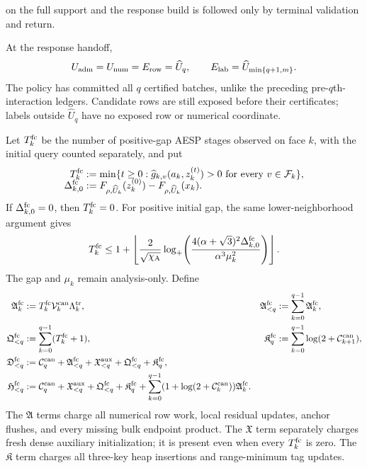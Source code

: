 \begin{definition}
\begin{enumerate}
       on the full support and the response build is followed only by
       terminal validation and return.
\end{enumerate}
At the response handoff,
\begin{equation}
 U_{\rm adm}=U_{\rm num}=E_{\rm row}=\widehat U_q,
 \qquad
 E_{\rm lab}=\widehat U_{\min\{q+1,m\}}.
 \label{eq:branch-caterpillar-incremental-face-arenas}
\end{equation}
The policy has committed all $q$ certified batches, unlike the preceding
pre-$q$th-interaction ledgers.  Candidate rows are still exposed before their
certificates; labels outside $\widehat U_q$ have no exposed row or numerical
coordinate.
\end{definition}

Let $T_k^{\rm fc}$ be the number of positive-gap AESP stages observed on face
$k$, with the initial query counted separately, and put
\begin{align}
 T_k^{\rm fc}
 &:=
 \min\{t\geq0:\widehat g_{k,v}(a_k,z_k^{(t)})>0
       \text{ for every }v\in\mathcal F_k\},
 \notag\\[-1.5ex]
 \Delta_{k,0}^{\rm fc}
 &:=F_{\rho,\widehat U_k}(z_k^{(0)})
       -F_{\rho,\widehat U_k}(x_k).
 \label{eq:branch-caterpillar-incremental-face-stopping-time}
\end{align}
If $\Delta_{k,0}^{\rm fc}=0$, then $T_k^{\rm fc}=0$.  For positive initial
gap, the same lower-neighborhood argument gives
\begin{equation}
 T_k^{\rm fc}\leq
 1+\left\lfloor\frac{2}{\sqrt{\chi_{\rm A}}}
 \log_+\!\left(
 \frac{4(\alpha+\sqrt3)^2\Delta_{k,0}^{\rm fc}}
      {\alpha^3\mu_k^2}
             \right)\right\rfloor.
 \label{eq:branch-caterpillar-incremental-face-stage-bound}
\end{equation}
The gap and $\mu_k$ remain analysis-only.  Define
\begin{align}
 \mathfrak A_k^{\rm fc}
 &:=T_k^{\rm fc}\mathcal V_k^{\rm can}\Lambda_k^{\rm tr},
 &
 \mathfrak A_{<q}^{\rm fc}
 &:=\sum_{k=0}^{q-1}\mathfrak A_k^{\rm fc},
 \notag\\
 \mathfrak Q_{<q}^{\rm fc}
 &:=\sum_{k=0}^{q-1}(T_k^{\rm fc}+1),
 &
 \mathfrak K_q^{\rm fc}
 &:=\sum_{k=0}^{q-1}
       \log(2+\mathcal C_{k+1}^{\rm can}),
 \notag\\
 \mathfrak D_{<q}^{\rm fc}
 &:=\mathcal C_q^{\rm can}+\mathfrak A_{<q}^{\rm fc}
   +\mathfrak X_{<q}^{\rm aux}+\mathfrak Q_{<q}^{\rm fc}
   +\mathfrak K_q^{\rm fc},
 \notag\\
 \mathfrak H_{<q}^{\rm fc}
 &:=\mathcal C_q^{\rm can}+\mathfrak X_{<q}^{\rm aux}
   +\mathfrak Q_{<q}^{\rm fc}+\mathfrak K_q^{\rm fc}
   +\sum_{k=0}^{q-1}
    (1+\log(2+\mathcal C_k^{\rm can}))\mathfrak A_k^{\rm fc}.
 \label{eq:branch-caterpillar-incremental-face-budgets}
\end{align}
The $\mathfrak A$ terms charge all numerical row work, local residual
updates, anchor flushes, and every missing bulk endpoint product.  The
$\mathfrak X$ term separately charges fresh dense auxiliary initialization;
it is present even when every $T_k^{\rm fc}$ is zero.  The $\mathfrak K$ term
charges all three-key heap insertions and range-minimum tag updates.

